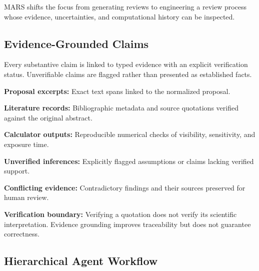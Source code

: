\documentclass[11pt,twoside]{article}
\begin{document}
MARS shifts the focus from generating reviews to engineering a review process whose evidence, uncertainties, and computational history can be inspected.

\subsection{Evidence-Grounded Claims}

Every substantive claim is linked to typed evidence with an explicit verification status.
Unverifiable claims are flagged rather than presented as established facts.

\noindent \textbf{Proposal excerpts:} Exact text spans linked to the normalized proposal.

\noindent \textbf{Literature records:} Bibliographic metadata and source quotations verified against the original abstract.

\noindent \textbf{Calculator outputs:} Reproducible numerical checks of visibility, sensitivity, and exposure time.

\noindent \textbf{Unverified inferences:} Explicitly flagged assumptions or claims lacking verified support.

\noindent \textbf{Conflicting evidence:} Contradictory findings and their sources preserved for human review.

\noindent \textbf{Verification boundary:} Verifying a quotation does not verify its scientific interpretation. Evidence grounding improves traceability but does not guarantee correctness.

\subsection{Hierarchical Agent Workflow}
\end{document}
